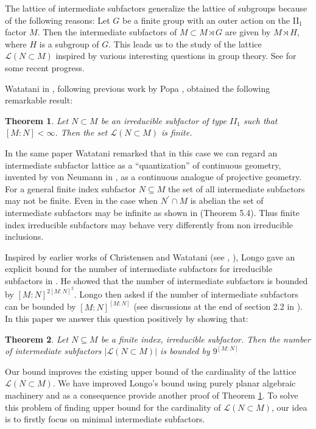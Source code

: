 \documentclass[11pt,letterpaper]{amsart}
\newtheorem{theorem}{Theorem}[section]
\theoremstyle{definition}
\theoremstyle{remark}
\begin{document}
The lattice of intermediate subfactors generalize the lattice of subgroups because of the following reasons:
Let $G$ be a finite group with an outer action on the II$_1$ factor $M$. 
 Then the intermediate subfactors of $M\subset M\rtimes G$ are 
 given by $M\rtimes H$, where $H$ is a subgroup of $G$. 
 This leads us to the study of the lattice $\mathcal{L}(N\subset M)$ inspired by various interesting questions in group theory. See \cite{GX,Xu3,Xu2,Xu,Pa} for some recent progress. 
 

Watatani in \cite{Wa}, following previous work by Popa \cite{Po1}, obtained the following remarkable result:
\begin{theorem}\label{watatani}\cite{Wa}
 Let $N\subset M$ be an irreducible subfactor of type $II_1$ such that $[M:N] < \infty$. Then 
 the set $\mathcal{L}(N\subset M)$ is finite.
\end{theorem}



In the same paper  Watatani remarked that in this case we can regard an intermediate subfactor lattice as a ``quantization'' of continuous geometry, invented by von Neumann in \cite{Ne}, as
a continuous analogue of projective geometry. For a general finite index subfactor $N\subseteq M$ the set of all intermediate subfactors may  not be finite.  Even in the case when $N^\prime \cap M$
is abelian the set of intermediate subfactors may be infinite as shown in \cite{TW} (Theorem 5.4).  Thus finite index irreducible subfactors may behave very differently from non irreducible inclusions. 

Inspired by earlier works of Christensen and Watatani (see \cite{Cr1}, \cite{Wa}), Longo gave an explicit bound for the number of intermediate subfactors for irreducible subfactors in \cite{Lo}. 
He showed that the number of intermediate subfactors is bounded by $[M:N]^{2[M:N]^2}$.
Longo then asked if the number of intermediate subfactors can be bounded by $[M:N]^{[M:N]}$ (see discussions at the end of section 2.2 in \cite{Lo}). 
In this paper we answer this question positively by showing that:
\begin{theorem}\label{Thm:inter}
	Let $N \subseteq M$ be a finite index, irreducible subfactor. Then the number of intermediate subfactors $|\mathcal{L}(N\subset M)|$ is bounded by $9^{[M:N]}$
\end{theorem}
 Our bound improves the existing upper bound of the cardinality of the lattice $\mathcal{L}(N\subset M).$ We have improved Longo's 
 bound using purely planar algebraic machinery and as a consequence provide another proof of Theorem \ref{watatani}. To solve this problem of finding upper bound for the cardinality of $\mathcal{L}(N\subset M)$, our idea is to firstly focus on
 minimal intermediate subfactors.
\end{document}

